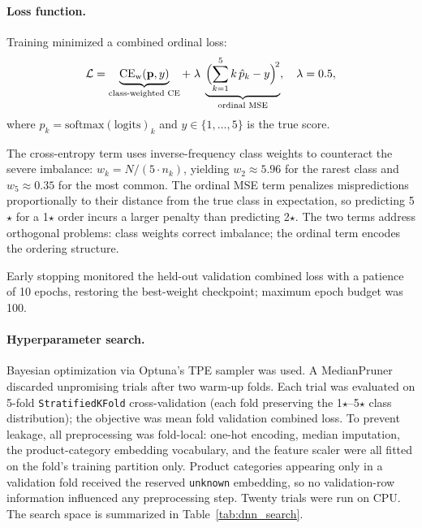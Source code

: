 \documentclass[11pt]{article}
\begin{document}
\paragraph{Loss function.}
Training minimized a combined ordinal loss:
\[
\mathcal{L}
= \underbrace{\mathrm{CE}_{\mathrm{w}}(\mathbf{p}, y)}_{\text{class-weighted CE}}
+ \;\lambda\;\underbrace{\Bigl(\sum_{k=1}^{5} k\,\hat{p}_k - y\Bigr)^{\!2}}_{\text{ordinal MSE}},
\quad \lambda = 0.5,
\]
where $\hat{p}_k = \mathrm{softmax}(\mathrm{logits})_k$ and $y \in \{1,\dots,5\}$ is the true score.

The cross-entropy term uses inverse-frequency class weights to counteract the severe imbalance: $w_k = N / (5 \cdot n_k)$, yielding $w_2 \approx 5.96$ for the rarest class and $w_5 \approx 0.35$ for the most common. The ordinal MSE term penalizes mispredictions proportionally to their distance from the true class in expectation, so predicting 5$\star$ for a 1$\star$ order incurs a larger penalty than predicting 2$\star$. The two terms address orthogonal problems: class weights correct imbalance; the ordinal term encodes the ordering structure.

Early stopping monitored the held-out validation combined loss with a patience of 10 epochs, restoring the best-weight checkpoint; maximum epoch budget was 100.

\paragraph{Hyperparameter search.}
Bayesian optimization via Optuna's TPE sampler was used. A MedianPruner discarded unpromising trials after two warm-up folds. Each trial was evaluated on 5-fold \texttt{StratifiedKFold} cross-validation (each fold preserving the 1$\star$--5$\star$ class distribution); the objective was mean fold validation combined loss. To prevent leakage, all preprocessing was fold-local: one-hot encoding, median imputation, the product-category embedding vocabulary, and the feature scaler were all fitted on the fold's training partition only. Product categories appearing only in a validation fold received the reserved \texttt{unknown} embedding, so no validation-row information influenced any preprocessing step. Twenty trials were run on CPU. The search space is summarized in Table~\ref{tab:dnn_search}.
\end{document}
